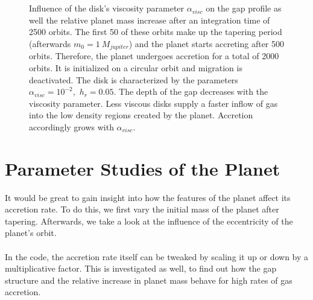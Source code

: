       \\
      \\
      \begin{figure}[h!]
        \centering
        \begin{minipage}{.5\linewidth}
          \centering
          \label{fig:influence_of_alpha:a}
        \end{minipage}%
        \begin{minipage}{.5\linewidth}
          \centering 
          \label{fig:influence_of_alpha:b}
        \end{minipage}
        \caption{
          Influence of the disk's viscosity parameter $\alpha_{visc}$ on 
          the gap profile as well the relative planet mass increase after an 
          integration time of 2500 orbits. The first 50 of these orbits make up 
          the tapering period (afterwards $m_0=1\ M_{jupiter}$) and the planet 
          starts accreting after 500 orbits. Therefore, the planet undergoes 
          accretion for a total of 2000 orbits. It is initialized on a circular 
          orbit and migration is deactivated. The disk is characterized by the 
          parameters $\alpha_{visc}=10^{-2}$,\ $h_r=0.05$.
          The depth of the gap decreases with the viscosity parameter. Less 
          viscous disks supply a faster inflow of gas into the low density 
          regions created by the planet. Accretion accordingly grows with 
          $\alpha_{visc}$.
        }
        \label{fig:influence_of_alpha}
      \end{figure}

  \newpage
  \section{Parameter Studies of the Planet}
    It would be great to gain insight into how the features of the planet 
    affect its accretion rate. To do this, we first vary the initial mass of 
    the planet after tapering. Afterwards, we take a look at the influence of 
    the eccentricity of the planet's orbit. \\
    \\
    In the code, the accretion rate itself can be tweaked by scaling it up or 
    down by a multiplicative factor. This is investigated as well, to find 
    out how the gap structure and the relative increase in planet mass behave 
    for high rates of gas accretion.

